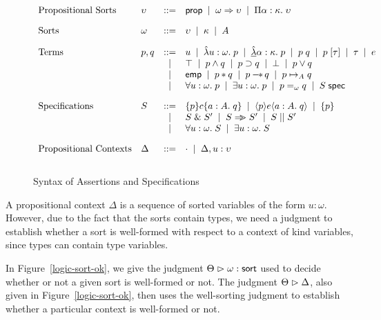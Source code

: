 \begin{figure}
\begin{displaymath}
\begin{array}{llcl}
\mbox{Propositional Sorts} & 
\upsilon & ::= & \mathsf{prop} \;\;|\;\; \omega \Rightarrow \upsilon \;\;|\;\; \Pi {\alpha}:{\kappa}.\;{\upsilon}
\\[1em]
\mbox{Sorts} & \omega & ::= & \upsilon \;\;|\;\; \kappa \;\;|\;\; A 
\\[1em]

\mbox{Terms} & 
p,q & ::= & u \;\;|\;\; \hat{\lambda} u:\omega.\;p \;\;|\;\; \underline{\hat{\lambda}} \alpha:\kappa.\;p \;\;|\;\; p\;q \;\;|\;\; p\;[\tau] \;\;|\;\; \tau \;\;|\;\; e \\
&   &  |  & \top \;\;|\;\; p \land q \;\;|\;\; p \supset q \;\;|\;\; \bot \;\;|\;\; p \vee q \\
&   &  |  & \mathsf{emp} \;\;|\;\; p * q \;\;|\;\; p -\!\!*\, q \;\;|\;\; p \mapsto_{A} q \\
&   &  |  & \forall u:\omega.\; p \;\;|\;\; \exists u:\omega.\; p \;\;|\;\; p =_\omega q \;\;|\;\;
            {S}\;\mathsf{spec} \\[1em]

\mbox{Specifications} & 
S & ::= & \{{p}\}{c}\{{a:A}.\;{q}\} \;\;|\;\; \langle{p}\rangle{e}\langle{a:A}.\;{q}\rangle \;\;|\;\; \{{p}\} \\
& &  |  & S \;\&\; S' \;\;|\;\; S \Rightarrow\!\!\!> S' \;\;|\;\; S \;||\; S' \\
& &  |  & \forall u:\omega.\; S \;\;|\;\; \exists u:\omega.\; S \\[1em]

\mbox{Propositional Contexts} & 
\Delta & ::= & \cdot \;\;|\;\; \Delta, u:\upsilon \\[1em]
\end{array}
\end{displaymath}
\caption{Syntax of Assertions and Specifications}
\label{logic-syntax}  
\end{figure}



A propositional context $\Delta$ is a sequence of sorted variables of
the form $u:\omega$. However, due to the fact that the sorts contain
types, we need a judgment to establish whether a sort is well-formed
with respect to a context of kind variables, since types can contain
type variables. 

In Figure~\ref{logic-sort-ok}, we give the judgment
${{\Theta}} \vartriangleright {{\omega}} : {\mathsf{sort}}$ used to decide whether or not a given sort is
well-formed or not. The judgment ${\Theta} \vartriangleright {\Delta}$, also given in
Figure~\ref{logic-sort-ok}, then uses the well-sorting judgment to
establish whether a particular context is well-formed or not. 

